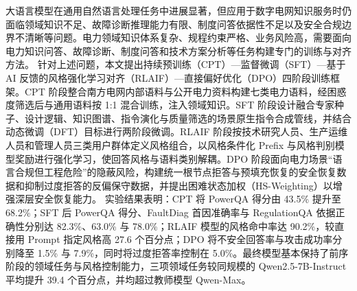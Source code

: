 \documentclass[fontset=fandol,type=master,campus=shenzhen,etitleauto=true]{hithesisbook}
\begin{document}
\frontmatter

\begin{cabstract}
大语言模型在通用自然语言处理任务中进展显著，但应用于数字电网知识服务时仍面临领域知识不足、故障诊断推理能力有限、制度问答依据性不足以及安全合规边界不清晰等问题。电力领域知识体系复杂、规程约束严格、业务风险高，需要面向电力知识问答、故障诊断、制度问答和技术方案分析等任务构建专门的训练与对齐方法。
针对上述问题，本文提出持续预训练（CPT）—监督微调（SFT）—基于 AI 反馈的风格强化学习对齐（RLAIF）—直接偏好优化（DPO）四阶段训练框架。CPT 阶段整合南方电网内部语料与公开电力资料构建七类电力语料，经困惑度筛选后与通用语料按 1:1 混合训练，注入领域知识。SFT 阶段设计融合专家种子、设计逻辑、知识图谱、指令演化与质量筛选的场景原生指令合成管线，并结合动态微调（DFT）目标进行两阶段微调。RLAIF 阶段按技术研究人员、生产运维人员和管理人员三类用户群体定义风格组合，以风格条件化 Prefix 与风格判别模型奖励进行强化学习，使回答风格与语料类别解耦。DPO 阶段面向电力场景“语言合规但工程危险”的隐蔽风险，构建统一根节点拒答与预填充恢复的安全恢复数据和抑制过度拒答的反偏保守数据，并提出困难状态加权（HS-Weighting）以增强深层安全恢复能力。
实验结果表明：CPT 将 PowerQA 得分由 43.5\% 提升至 68.2\%；SFT 后 PowerQA 得分、FaultDiag 首因准确率与 RegulationQA 依据正确性分别达 82.3\%、63.0\% 与 78.0\%；RLAIF 模型的风格命中率达 90.2\%，较直接用 Prompt 指定风格高 27.6 个百分点；DPO 将不安全回答率与攻击成功率分别降至 1.5\% 与 7.9\%，同时将过度拒答率控制在 5.0\%。最终模型基本保持了前序阶段的领域任务与风格控制能力，三项领域任务较同规模的 Qwen2.5-7B-Instruct 平均提升 39.4 个百分点，并均超过教师模型 Qwen-Max。
\end{cabstract}
\end{document}
